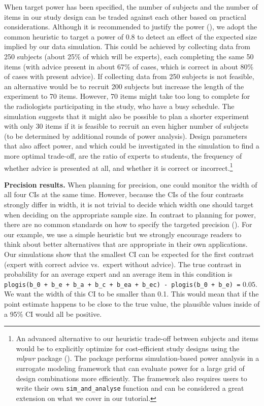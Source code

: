 \documentclass[
  man,
  floatsintext,
  longtable,
  a4paper,
  nolmodern,
  notxfonts,
  notimes,
  colorlinks=true,linkcolor=blue,citecolor=blue,urlcolor=blue]{apa7}
\begin{document}
When target power has been specified, the number of subjects and the
number of items in our study design can be traded against each other
based on practical considerations. Although it is recommended to justify
the power (), we adopt the common heuristic to target a power of 0.8 to
detect an effect of the expected size implied by our data simulation.
This could be achieved by collecting data from 250 subjects (about 25\%
of which will be experts), each completing the same 50 items (with
advice present in about 67\% of cases, which is correct in about 80\% of
cases with present advice). If collecting data from 250 subjects is not
feasible, an alternative would be to recruit 200 subjects but increase
the length of the experiment to 70 items. However, 70 items might take
too long to complete for the radiologists participating in the study,
who have a busy schedule. The simulation suggests that it might also be
possible to plan a shorter experiment with only 30 items if it is
feasible to recruit an even higher number of subjects (to be determined
by additional rounds of power analysis). Design parameters that also
affect power, and which could be investigated in the simulation to find
a more optimal trade-off, are the ratio of experts to students, the
frequency of whether advice is presented at all, and whether it is
correct or incorrect.\footnote{An advanced alternative to our heuristic
  trade-off between subjects and items would be to explicitly optimize
  for cost-efficient study designs using the \emph{mlpwr} package
  ().
  The package performs simulation-based power analysis in a surrogate
  modeling framework that can evaluate power for a large grid of design
  combinations more efficiently. The framework also requires users to
  write their own \texttt{sim\_and\_analyse} function and can be
  considered a great extension on what we cover in our tutorial.}

\textbf{Precision results.} When planning for precision, one could
monitor the width of all four CIs at the same time. However, because the
CIs of the four contrasts strongly differ in width, it is not trivial to
decide which width one should target when deciding on the appropriate
sample size. In contrast to planning for power, there are no common
standards on how to specify the targeted precision
(). For
our example, we use a simple heuristic but we strongly encourage readers
to think about better alternatives that are appropriate in their own
applications. Our simulations show that the smallest CI can be expected
for the first contrast (expert with correct advice vs.~expert without
advice). The true contrast in probability for an average expert and an
average item in this condition is
\texttt{plogis(b\_0\ +\ b\_e\ +\ b\_a\ +\ b\_c\ +\ b\_ea\ +\ b\_ec)\ -\ plogis(b\_0\ +\ b\_e)\ =}
\(0.05\). We want the width of this CI to be smaller than 0.1. This
would mean that if the point estimate happens to be close to the true
value, the plausible values inside of a 95\% CI would all be positive.
\end{document}
